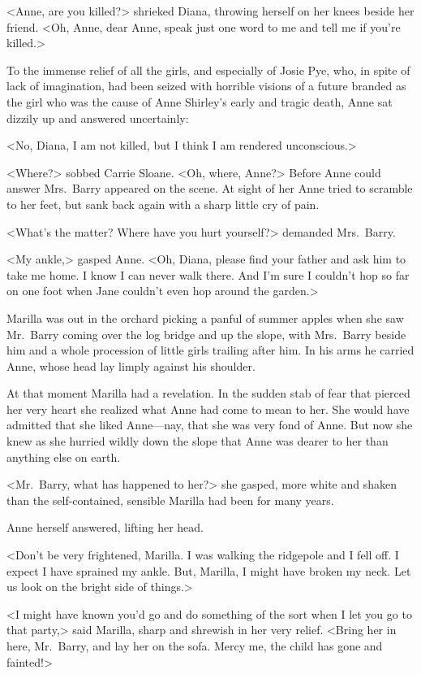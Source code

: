<Anne, are you killed?> shrieked Diana, throwing herself on her knees beside her friend. <Oh, Anne, dear Anne, speak just one word to me and tell me if you're killed.>

To the immense relief of all the girls, and especially of Josie Pye, who, in spite of lack of imagination, had been seized with horrible visions of a future branded as the girl who was the cause of Anne Shirley's early and tragic death, Anne sat dizzily up and answered uncertainly:

<No, Diana, I am not killed, but I think I am rendered unconscious.>

<Where?> sobbed Carrie Sloane. <Oh, where, Anne?> Before Anne could answer Mrs.~Barry appeared on the scene. At sight of her Anne tried to scramble to her feet, but sank back again with a sharp little cry of pain.

<What's the matter? Where have you hurt yourself?> demanded Mrs.~Barry.

<My ankle,> gasped Anne. <Oh, Diana, please find your father and ask him to take me home. I know I can never walk there. And I'm sure I couldn't hop so far on one foot when Jane couldn't even hop around the garden.>

Marilla was out in the orchard picking a panful of summer apples when she saw Mr.~Barry coming over the log bridge and up the slope, with Mrs.~Barry beside him and a whole procession of little girls trailing after him. In his arms he carried Anne, whose head lay limply against his shoulder.

At that moment Marilla had a revelation. In the sudden stab of fear that pierced her very heart she realized what Anne had come to mean to her. She would have admitted that she liked Anne—nay, that she was very fond of Anne. But now she knew as she hurried wildly down the slope that Anne was dearer to her than anything else on earth.

<Mr.~Barry, what has happened to her?> she gasped, more white and shaken than the self-contained, sensible Marilla had been for many years.

Anne herself answered, lifting her head.

<Don't be very frightened, Marilla. I was walking the ridgepole and I fell off. I expect I have sprained my ankle. But, Marilla, I might have broken my neck. Let us look on the bright side of things.>

<I might have known you'd go and do something of the sort when I let you go to that party,> said Marilla, sharp and shrewish in her very relief. <Bring her in here, Mr.~Barry, and lay her on the sofa. Mercy me, the child has gone and fainted!>

